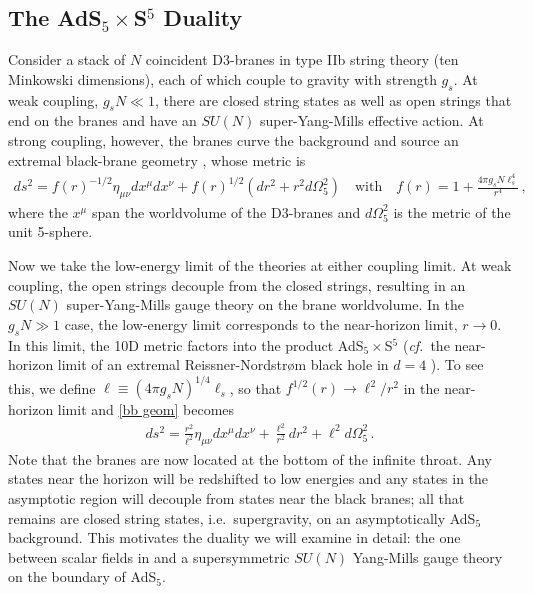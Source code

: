 \documentclass[../PhD.tex]{subfiles}
\begin{document}

\subsection{The AdS$_5 \times$S$^5$ Duality}
\label{ssec: AdS5xS5}

Consider a stack of $N$ coincident D3-branes in type IIb string theory (ten Minkowski dimensions), each of which couple to gravity with strength $g_s$. At weak coupling, $g_s N \ll 1$, there are closed string states as well as open strings that end on the branes and have an $SU(N)$ super-Yang-Mills effective action. At strong coupling, however, the branes curve the background and source an extremal black-brane geometry \cite{Zwiebach:2004tj}, whose metric is
\begin{align}
\label{bb geom}
ds^2 = f(r)^{-1/2} \eta_{\mu \nu} dx^\mu dx^\nu + f(r)^{1/2} \left(  dr^2 + r^2 d\Omega_5^2 \right)  \quad  \text{with} \quad f(r) = 1 + \frac{4 \pi g_s N \ell_s^4}{r^4} \, ,
\end{align}
where the $x^\mu$ span the worldvolume of the D3-branes and $d\Omega_5^2$ is the metric of the unit 5-sphere.

Now we take the low-energy limit of the theories at either coupling limit. At weak coupling, the open strings decouple from the closed strings, resulting in an $SU(N)$ super-Yang-Mills gauge theory on the brane worldvolume. In the $g_s N \gg 1$ case, the low-energy limit corresponds to the near-horizon limit, $r \to 0$. In this limit, the 10D metric factors into the product AdS$_5 \times$S$^5$ ({\it cf.}~the near-horizon limit of an extremal Reissner-Nordstr\o m black hole in $d=4$ \cite{Horowitz:1991cd}). To see this, we define $\ell \equiv (4\pi g_s N)^{1/4} \ell_s$, so that $f^{1/2}(r) \to \ell^2 / r^2$ in the near-horizon limit and \eqref{bb geom} becomes
\begin{align}
\label{param rels}
ds^2 = \frac{r^2}{\ell^2} \eta_{\mu \nu} dx^\mu dx^\nu + \frac{\ell^2}{r^2}dr^2 + \ell^2 d\Omega_5^2 \, .
\end{align}
Note that the branes are now located at the bottom of the infinite throat. Any states near the horizon will be redshifted to low energies and any states in the asymptotic region will decouple from states near the black branes; all that remains are closed string states, i.e.~supergravity, on an asymptotically AdS$_5$ background. This motivates the duality we will examine in detail: the one between scalar fields in \ads and a supersymmetric $SU(N)$ Yang-Mills gauge theory on the boundary of AdS$_5$.
\end{document}
